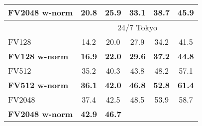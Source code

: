 \begin{tabularx}{0.883\linewidth}{|l|c c c c c|}
        \rowcolor{maroon!10}
        \textbf{FV2048 w-norm}  & \textbf{20.8} & \textbf{25.9} & \textbf{33.1} & \textbf{38.7} & \textbf{45.9} \\
        \hline
			\rowcolor{maroon!40}
			\multicolumn{1}{|c}{\quad} & \multicolumn{5}{c|}{24/7 Tokyo} \\
		\hline
		\rowcolor{maroon!10}
		\textcolor{petr}{FV128} 						&\textcolor{petr}{14.2}     
														&\textcolor{petr}{20.0}     
														&\textcolor{petr}{27.9}     
														&\textcolor{petr}{34.2}     
														&\textcolor{petr}{41.5} \\
		\rowcolor{maroon!10}
		\textcolor{petr}{\textbf{FV128 w-norm}}       	&\textcolor{petr}{\textbf{16.9}}     
														&\textcolor{petr}{\textbf{22.0}}    
														&\textcolor{petr}{\textbf{29.6}}    
														&\textcolor{petr}{\textbf{37.2}}     
														&\textcolor{petr}{\textbf{44.8}} \\  
	    \hline  
		\rowcolor{maroon!10}
		\textcolor{petr}{FV512}							&\textcolor{petr}{35.2}      
														&\textcolor{petr}{40.3}       
														&\textcolor{petr}{43.8}      
														&\textcolor{petr}{48.2}      
														&\textcolor{petr}{57.1} \\
		\rowcolor{maroon!10}
		\textcolor{petr}{\textbf{FV512 w-norm}}			&\textcolor{petr}{\textbf{36.1}}       
														&\textcolor{petr}{\textbf{42.0}}      
														&\textcolor{petr}{\textbf{46.8}}
														&\textcolor{petr}{\textbf{52.8}}       
														&\textcolor{petr}{\textbf{61.4}} \\ 
	    \hline   
    	\rowcolor{maroon!10}
    	\textcolor{petr}{FV2048}						&\textcolor{petr}{37.4}       
					    								&\textcolor{petr}{42.5}       
					    								&\textcolor{petr}{48.5}       
					    								&\textcolor{petr}{53.9}       
					    								&\textcolor{petr}{58.7} 	\\
    	\rowcolor{maroon!10}
		\textcolor{petr}{\textbf{FV2048 w-norm}}		&\textcolor{petr}{\textbf{42.9}}       
														&\textcolor{petr}{\textbf{46.7}}       

\end{tabularx}
